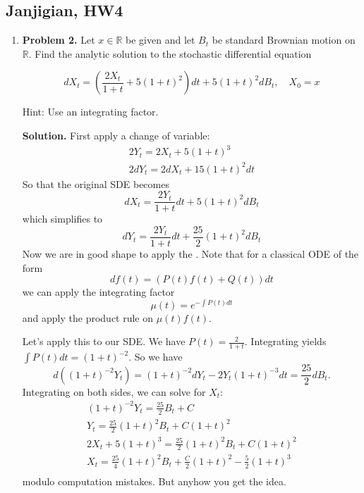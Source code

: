 \subsection{Janjigian, HW4}

\begin{enumerate}
    \item \textbf{Problem 2.} Let $x \in \mathbb{R}$ be given and let $B_t$ be standard Brownian motion on $\mathbb{R}$. Find the analytic solution to the stochastic differential equation

    \[
    d X_t=\left(\frac{2 X_t}{1+t}+5(1+t)^2\right) d t+5\left(1+t\right)^2 d B_t, \quad X_0=x
    \]
    
    
    Hint: Use an integrating factor.
    
    \textbf{Solution.} First apply a change of variable:
    \begin{gather*}
        2 Y_t = 2 X_t + 5(1+t)^3 \\
        2 d Y_t = 2 d X_t + 15(1+t)^2 d t 
    \end{gather*}
    So that the original SDE becomes
    \[
        d X_t = \frac{2 Y_t}{1+t} dt + 5(1+t)^2 d B_t
    \]
    which simplifies to
    \[
        d Y_t = \frac{2 Y_t}{1+t} dt + \frac{25}{2} (1+t)^2 d B_t
    \]
    Now we are in good shape to apply the .
    Note that for a classical ODE of the form
    \[
        d f(t) = (P(t) f(t) + Q(t)) dt
    \]
    we can apply the integrating factor
    \[
        \mu(t) = e^{-\int P(t) dt}
    \]
    and apply the product rule on $\mu(t) f(t)$.

    Let's apply this to our SDE. We have $P(t) = \frac{2}{1+t}$.
    Integrating yields $\int P(t) dt = (1+t)^{-2}$.
    So we have
    \[
        d((1+t)^{-2} Y_t) 
        = (1+t)^{-2} d Y_t -2 Y_t (1+t)^{-3} dt
        = \frac{25}{2} d B_t.
    \]
    Integrating on both sides, we can solve for $X_t$:
    \begin{gather*}
        (1+t)^{-2} Y_t = \frac{25}{2} B_t + C \\
        Y_t = \frac{25}{2} (1+t)^2 B_t + C (1+t)^2\\
        2 X_t + 5(1+t)^3 = \frac{25}{2} (1+t)^2 B_t + C (1+t)^2\\
        X_t = \frac{25}{4} (1+t)^2 B_t + \frac{C}{2} (1+t)^2 - \frac{5}{2} (1+t)^3\\
    \end{gather*}
    modulo computation mistakes. But anyhow you get the idea.

        
        




\end{enumerate}